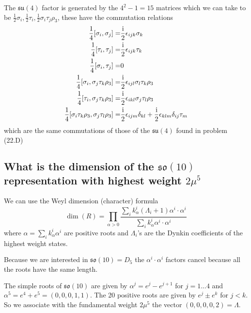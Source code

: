 \documentclass[main.tex]{subfiles}
\begin{document}
The $\mathfrak{su}(4)$ factor is generated by the $4^2-1=15$ matrices which we can take to be $\frac{1}{2}\sigma_i,\frac{1}{2}\tau_i,\frac{1}{2}\sigma_i\tau_j\rho_3$, these have the commutation relations
\begin{align}
\frac{1}{4}[\sigma_i,\sigma_j]=&\frac{\mathrm{i}}{2}\epsilon_{ijk}\sigma_k\\
\frac{1}{4}[\tau_i,\tau_j]=&\frac{\mathrm{i}}{2}\epsilon_{ijk}\tau_k\\
\frac{1}{4}[\sigma_i,\tau_j]=&0\\
\frac{1}{4}[\sigma_i,\sigma_j\tau_k\rho_3]=&\frac{\mathrm{i}}{2}\epsilon_{ijl}\sigma_l\tau_k\rho_3\\
\frac{1}{4}[\tau_i,\sigma_j\tau_k\rho_3]=&\frac{\mathrm{i}}{2}\epsilon_{ikl}\sigma_j\tau_l\rho_3\\
\frac{1}{4}[\sigma_i\tau_k\rho_3,\sigma_j\tau_l\rho_3]=&\frac{\mathrm{i}}{2}\epsilon_{ijm}\delta_{kl}+\frac{\mathrm{i}}{2}\epsilon_{klm}\delta_{ij}\tau_m
\end{align}
which are the same commutations of those of the $\mathfrak{su}(4)$ found in problem (22.D)

\subsection{What is the dimension of the $\mathfrak{so}(10)$ representation with highest weight $2\mu^5$}
We can use the Weyl dimension (character) formula \cite{Cahn:1985wk}
\begin{equation}
\dim{(R)}=\prod_{\alpha>0}\frac{\sum_ik^i_{\alpha}(\Lambda_i+1)\alpha^i\cdot\alpha^i}{\sum_ik^i_{\alpha}\alpha^i\cdot\alpha^i}
\end{equation}
where $\alpha=\sum_ik_{\alpha}^i\alpha^i$ are positive roots and $\Lambda_i$'s are the Dynkin coefficients of the highest weight states.

Because we are interested in $\mathfrak{so}(10)=D_5$ the $\alpha^i\cdot\alpha^i$ factors cancel because all the roots have the same length.

The simple roots of $\mathfrak{so}(10)$ are given by $\alpha^j=e^j-e^{j+1}$ for $j=1...4$ and $\alpha^5=e^4+e^{5}=(0,0,0,1,1)$. The 20 positive roots are given by $e^j\pm e^k$ for $j<k$.
So we associate with the fundamental weight $2\mu^5$ the vector $(0,0,0,0,2)=\Lambda$.
\end{document}
